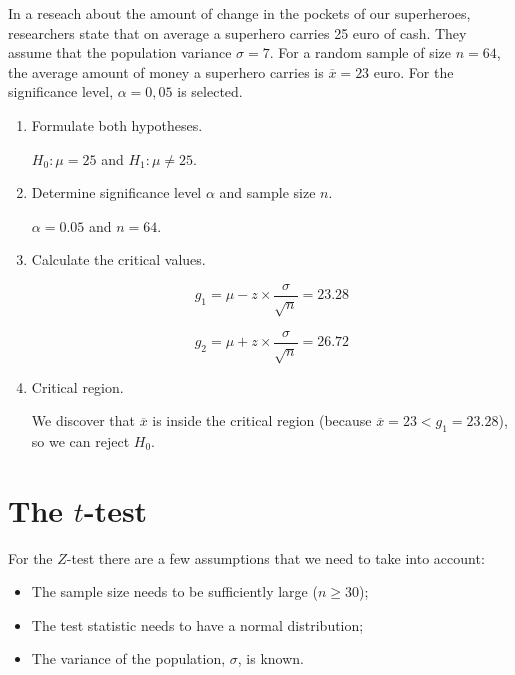 \begin{example}
  In a reseach about the amount of change in the pockets of our superheroes, researchers state that on average a superhero carries 25 euro of cash.
  They assume that the population variance $\sigma = 7$.
  For a random sample of size $n=64$, the average amount of money a superhero carries is $\overline{x} = 23$ euro. 
  For the significance level, $\alpha = 0,05$ is selected.
  
  \begin{enumerate}
    \item Formulate both hypotheses.
    
    $H_{0} : \mu = 25$ and $H_{1}: \mu \neq 25$.
    
    \item Determine significance level $\alpha$ and sample size $n$.
    
    $\alpha = 0.05$ and $n=64$.
    
    \item Calculate the critical values.
    
    \[ g_{1} = \mu - z \times \frac{\sigma}{\sqrt{n}} = 23.28 \]
    
    \[ g_{2} = \mu + z \times \frac{\sigma}{\sqrt{n}} = 26.72 \]
    
    \item Critical region.
    
    We discover that $\overline{x}$ is inside the critical region (because $\overline{x} = 23 < g_1 = 23.28$), so we can reject $H_{0}$.
    
  \end{enumerate}
\end{example}

\section{The \texorpdfstring{$t$}{t}-test}
\label{sec:t-test}

For the $Z$-test there are a few assumptions that we need to take into account:

\begin{itemize}
  \item The sample size needs to be sufficiently large ($n \ge 30$);
  \item The test statistic needs to have a normal distribution;
  \item The variance of the population, $\sigma$, is known.
\end{itemize}
 
